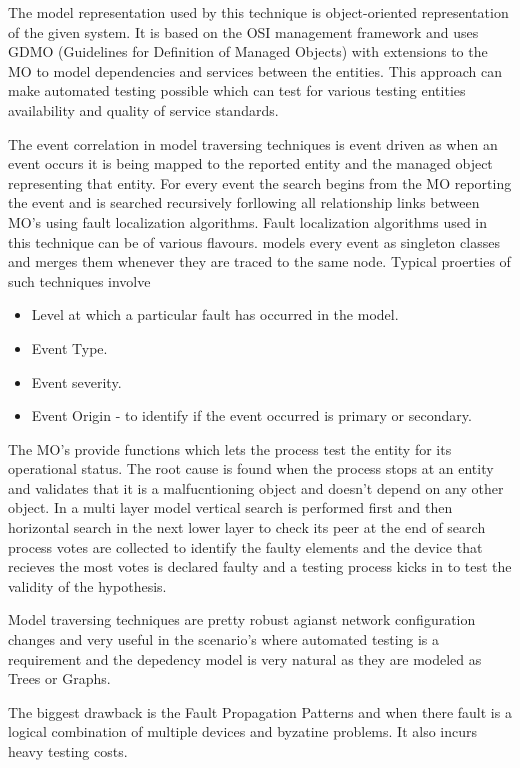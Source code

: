 \documentclass[10pt]{sigplan-proc-varsize}
\begin{document}
The model representation used by this technique is object-oriented representation of the given system. It is based on the OSI management framework and uses GDMO (Guidelines for  Definition  of Managed Objects) with extensions to the MO to model dependencies and services between the entities. This approach can make automated testing possible which can test for various testing entities availability and quality of service standards. 

The event correlation in model traversing techniques is event driven as when an event occurs it is being mapped to the reported entity and the managed object representing that entity. For every event the search begins from the MO reporting the event and is searched recursively forllowing all relationship links between MO's using fault localization algorithms.  Fault localization algorithms used in this technique can be of various flavours.  models every event as singleton classes and merges them whenever they are traced to the same node. Typical proerties of such techniques involve 

\begin{itemize}
  \item Level at which a particular fault has occurred in the model.
  \item Event Type.
  \item Event severity.
  \item Event Origin - to identify if the event occurred is primary or secondary.
\end{itemize}

The MO's provide functions which lets the process test the entity for its operational status.  The root cause is found when the process stops at an entity and validates that it is a malfucntioning object and doesn't depend on any other object. In a multi layer model vertical search is performed first and then horizontal search in the next lower layer to check its peer at the end of search process votes are collected to identify the faulty elements and the device that recieves the most votes is declared faulty and a testing process kicks in to test the validity of the hypothesis. 

Model traversing techniques are pretty robust agianst network configuration changes and very useful in the scenario's where automated testing is a requirement and the depedency model is very natural as they are modeled as Trees or Graphs. 

The biggest drawback is the Fault Propagation Patterns and when there  fault is a logical combination of multiple devices and byzatine problems. It also incurs heavy testing costs. 
\end{document}
